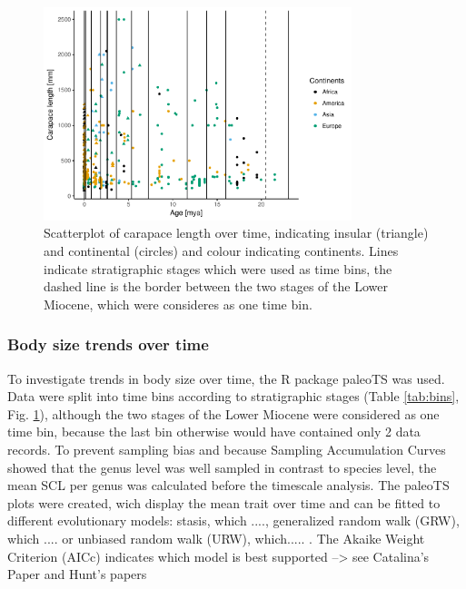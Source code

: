 \begin{figure}[htbp]
	\centering
	\includegraphics[width=0.8\textwidth]{MA_JJ_files/figure-latex/overviewData-1.pdf}
	\caption[Carapace length over time]{Scatterplot of carapace length over time, indicating insular
		(triangle) and continental (circles) and colour indicating continents.
		Lines indicate stratigraphic stages which were used as time bins, the
		dashed line is the border between the two stages of the Lower Miocene,
		which were consideres as one time bin.}
	\label{fig:bins}
\end{figure}





\subsubsection{Body size trends over time}
To investigate trends in body size over time, the R package paleoTS \citep{Hunt2015a} was used. Data were split into time bins according to stratigraphic stages (Table \ref{tab:bins}, Fig. \ref{fig:bins}), although the two stages of the Lower Miocene were considered as one time bin, because the last bin otherwise would have contained only 2 data records. To prevent sampling bias and because Sampling Accumulation Curves showed that the genus level was well sampled in contrast to species level, the mean SCL per genus was calculated before the timescale analysis. The paleoTS plots were created, wich display the mean trait over time and can be fitted to different evolutionary models: stasis, which ...., generalized random walk (GRW), which .... or unbiased random walk (URW), which..... . The Akaike Weight Criterion (AICc) indicates which model is best supported --> see Catalina's Paper and Hunt's papers


\FloatBarrier
